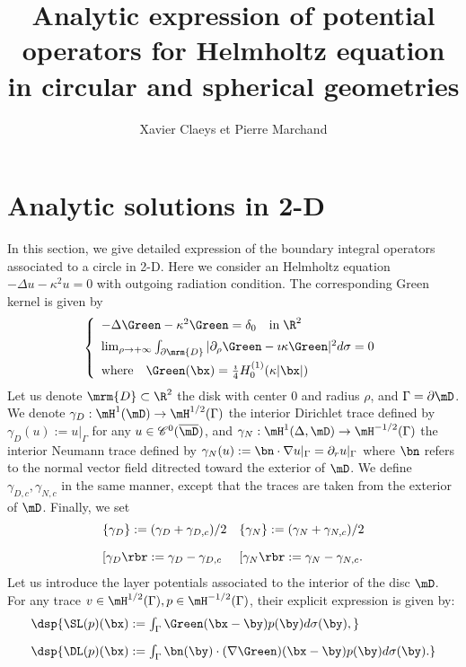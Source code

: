 \documentclass[a4paper,11pt]{article}
\date{}
\author{Xavier Claeys et Pierre Marchand}
\title{Analytic expression of potential operators for Helmholtz equation in circular and spherical geometries}
\begin{document}
\maketitle


\section*{Analytic solutions in 2-D}

In this section, we give detailed expression of the boundary integral operators associated to a circle in 2-D.
Here we consider an Helmholtz equation   $-\Delta u -\kappa^{2}u = 0$ with outgoing radiation condition.
The corresponding Green kernel is given by
$$
\left\{\begin{array}{l}
-\Delta \Green - \kappa^{2}\Green = \delta_{0}\quad\textrm{in}\;\R^{2}\\[5pt]
\lim_{\rho\to +\infty}\int_{\partial\mrm{D}}\vert \partial_{\rho}\Green - \imath\kappa \Green\vert^{2}d\sigma = 0\\[5pt]
\textrm{where}\quad  \Green(\bx) = \frac{\imath}{4}H_{0}^{(1)}(\kappa\vert \bx\vert)
\end{array}\right.
$$
Let us denote $\mrm{D}\subset\R^{2}$ the disk with center $0$ and radius $\rho$, and $\Gamma = \partial\mD$.
We denote $\gamma_{D}:\mH^{1}(\mD)\to \mH^{1/2}(\Gamma)$ the interior Dirichlet trace defined by $\gamma_{D}(u):= u\vert_{\Gamma}$
for any $u\in \mathscr{C}^{0}(\overline{\mD})$, and  $\gamma_{N}:\mH^{1}(\Delta,\mD)\to \mH^{-1/2}(\Gamma)$ the interior
Neumann trace defined by $\gamma_{N}(u) := \bn\cdot\nabla u\vert_{\Gamma} = \partial_{r}u\vert_{\Gamma}$ where $\bn$ refers to
the normal vector field ditrected toward the exterior of $\mD$. We define $\gamma_{D,c},\gamma_{N,c}$ in the
same manner, except that the traces are taken from the exterior of $\mD$. Finally, we set
$$
\begin{array}{ll}
\{\gamma_{D}\}:= (\gamma_{D}+\gamma_{D,c})/2 &  \{\gamma_{N}\}:= (\gamma_{N}+\gamma_{N,c})/2\\[10pt]
\lbrack\gamma_{D}\rbr:=\gamma_{D}-\gamma_{D,c} & \lbrack\gamma_{N}\rbr:=\gamma_{N}-\gamma_{N,c}.
\end{array}
$$
Let us introduce the layer potentials associated to the interior of the disc $\mD$.
For any trace $v\in\mH^{1/2}(\Gamma), p\in\mH^{-1/2}(\Gamma)$, their explicit expression
is given by:
\begin{equation}\label{PotentialOperators}
\begin{array}{l}
\dsp{ \SL(p)(\bx):=\int_{\Gamma}\Green(\bx-\by)p(\by) d\sigma(\by), }\\[10pt]
\dsp{ \DL(p)(\bx):=\int_{\Gamma}\bn(\by)\cdot(\nabla\Green)(\bx-\by)p(\by) d\sigma(\by). }
\end{array}
\end{equation}
\end{document}
